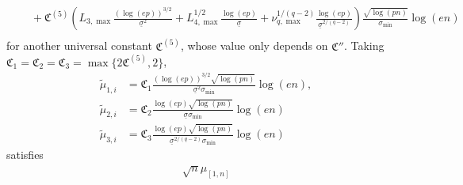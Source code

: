 \documentclass[aos]{imsart}
\begin{document}
\begin{appendix}
\begin{equation*}
\begin{aligned}
    & \quad + \mathfrak{C}^{(5)} \left(
        {L}_{3,\max} \frac{(\log(ep))^{3/2}}{\underline{\sigma}^2}
        + {L}_{4,\max}^{1/2} \frac{\log(ep)}{\underline{\sigma}}
        + \nu_{q,\max}^{1/(q-2)} \frac{\log(ep)}{\underline{\sigma}^{2/(q-2)}}
    \right)
    \frac{\sqrt{\log(pn)}}{\sigma_{\min}} \log\left(e n\right) \\
\end{aligned}
\end{equation*}
for another universal constant $\mathfrak{C}^{(5)}$, whose value only depends on $\mathfrak{C}''$.
Taking $\mathfrak{C}_1 = \mathfrak{C}_2 = \mathfrak{C}_3 = \max\{2 \mathfrak{C}^{(5)}, 2\}$,
\begin{equation*}
\begin{aligned}
    \tilde\mu_{1,i} 
    & = \mathfrak{C}_1 \frac{(\log(ep))^{3/2}\sqrt{\log(pn)}}{\underline\sigma^2\sigma_{\min}} \log\left(e n\right), \\
    \tilde\mu_{2,i}
    & = \mathfrak{C}_2 \frac{\log(ep)\sqrt{\log(pn)}}{\underline\sigma \sigma_{\min}} \log\left(e n\right) \\
    \tilde\mu_{3,i}
    & = \mathfrak{C}_3 \frac{\log(ep)\sqrt{\log(pn)}}{\underline\sigma^{2/(q-2)} \sigma_{\min}} \log\left(e n\right)
\end{aligned}
\end{equation*}
satisfies
\begin{equation*}
\begin{aligned}
    \sqrt{n} \mu_{[1,n]}

\end{aligned}
\end{equation*}
\end{appendix}
\end{document}
